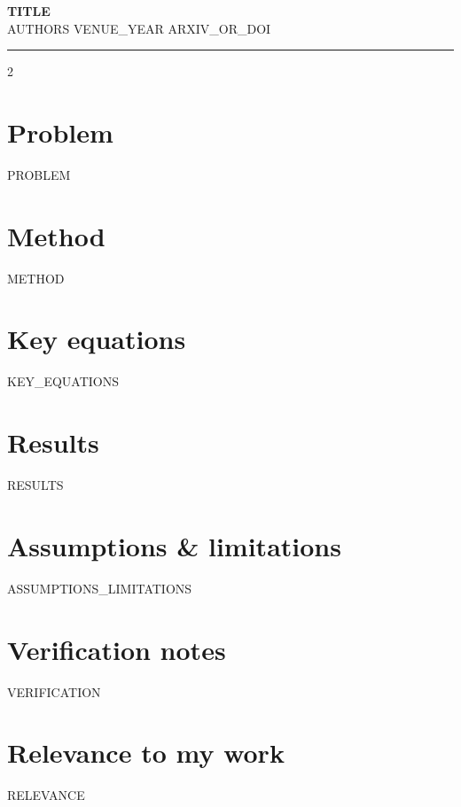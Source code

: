 \documentclass[10pt]{article}
\begin{document}
{\large\bfseries {{TITLE}}}\\[-2pt]
{\footnotesize {{AUTHORS}} \hfill {{VENUE_YEAR}} \hfill {{ARXIV_OR_DOI}}}
\hrule\vspace{4pt}

\begin{multicols}{2}
\section*{Problem}
{{PROBLEM}}

\section*{Method}
{{METHOD}}

\section*{Key equations}
{{KEY_EQUATIONS}}

\section*{Results}
{{RESULTS}}

\section*{Assumptions \& limitations}
{{ASSUMPTIONS_LIMITATIONS}}

\section*{Verification notes}
{{VERIFICATION}}

\section*{Relevance to my work}
{{RELEVANCE}}
\end{multicols}
\end{document}

